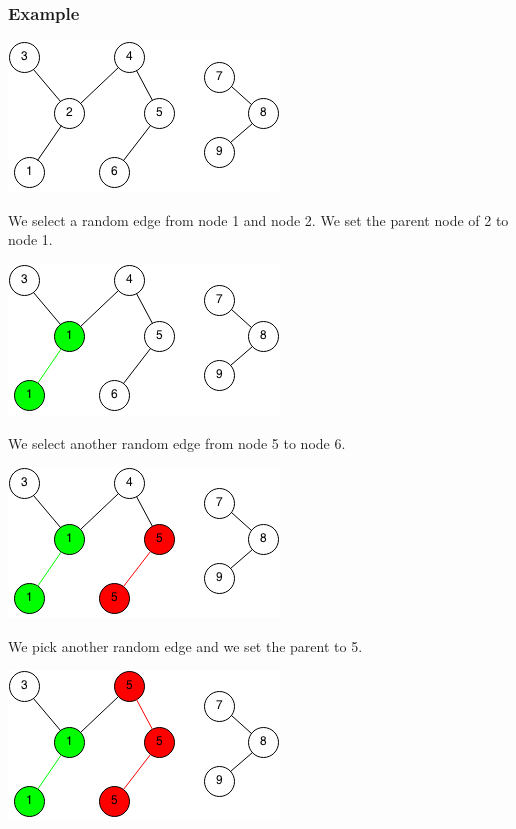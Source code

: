\documentclass[11pt,oneside]{book}
\makeatletter
\def\maxwidth#1{\ifdim\Gin@nat@width>#1 #1\else\Gin@nat@width\fi}
\makeatother
\begin{document}
\subsubsection{Example}

\includegraphics[width=\maxwidth{\textwidth}]{connectedcomponents.png}

We select a random edge from node 1 and node 2. We set the parent node of 2 to node 1.

\includegraphics[width=\maxwidth{\textwidth}]{connectedcomponents2.png}

We select another random edge from node 5 to node 6.

\includegraphics[width=\maxwidth{\textwidth}]{connectedcomponents3.png}

We pick another random edge and we set the parent to 5.

\includegraphics[width=\maxwidth{\textwidth}]{connectedcomponents4.png}
\end{document}
